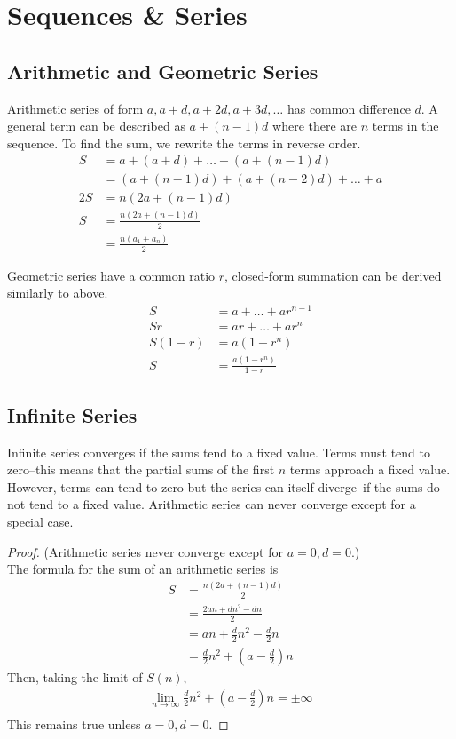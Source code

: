 \section{Sequences \& Series}

\subsection{Arithmetic and Geometric Series}

Arithmetic series of form $a,a+d,a+2d,a+3d,\ldots$ has common difference $d$.
A general term can be described as $a+(n-1)d$ where there are $n$ terms in the sequence.
To find the sum, we rewrite the terms in reverse order.
\begin{align*}
    S&= a + (a + d)  + \ldots + (a + (n-1)d)\\
    &= (a + (n-1)d) + (a + (n-2)d) + \ldots + a\\
    2S &= n(2a + (n-1)d)\\
    S&=\frac{n(2a + (n-1)d)}{2}\\
    &= \frac{n(a_1 + a_n)}{2}
\end{align*}

Geometric series have a common ratio $r$, closed-form summation can be derived similarly to above.
\begin{align*}
    S&= a + \ldots + ar^{n-1}\\
    Sr &= ar + \ldots + ar^n\\
    S(1 - r) &= a(1 - r^n)\\
    S&=\frac{a(1-r^n)}{1-r}
\end{align*}

\subsection{Infinite Series}

Infinite series converges if the sums tend to a fixed value. Terms must tend to zero--this means that
the partial sums of the first $n$ terms approach a fixed value.
However, terms can tend to zero but the series can itself diverge--if the sums do not tend to a fixed value.
Arithmetic series can never converge except for a special case.

\begin{proof} (Arithmetic series never converge except for $a=0, d=0$.)\\
    The formula for the sum of an arithmetic series is
    \begin{align*}
        S&=\frac{n(2a+(n-1)d)}{2}\\
        &=\frac{2an + dn^2-dn}{2}\\
        &=an + \frac{d}{2}n^2 -\frac{d}{2}n\\
        &=\frac{d}{2}n^2 + \left(a-\frac{d}{2}\right)n
    \end{align*}
    Then, taking the limit of $S(n)$,
    \begin{align*}
        \lim_{n\to\infty} \frac{d}{2}n^2 + \left(a-\frac{d}{2}\right)n=\pm\infty\\
    \end{align*}
    This remains true unless $a=0,d=0$.
\end{proof}

